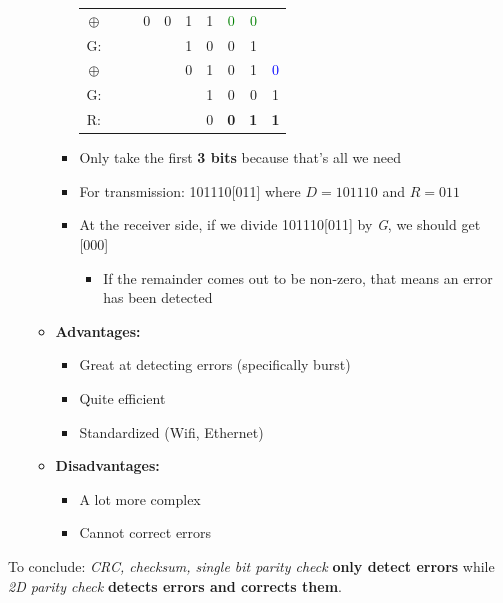 \documentclass{article}
\begin{document}
\begin{itemize}
\begin{itemize}
\begin{itemize}
\begin{center}
\begin{tabular}{cccccccccc}
                    \hline
                    $\oplus$ & & & 0 & 0 & 1 & 1 & \textcolor{green}0 & \textcolor{green}0 \\
                    G: & & & & & 1 & 0 & 0 & 1 \\
                    \hline
                    $\oplus$ & & & & & 0 & 1 & 0 & 1 & \textcolor{blue}0 \\
                    G: & & & & & & 1 & 0 & 0 & 1 \\
                    \hline
                    R: & & & & & & 0 & \textbf{0} & \textbf{1} & \textbf{1}
                \end{tabular}
            \end{center}
            \item Only take the first \textbf{3 bits} because that's all we need
            \item For transmission: 101110[011] where $D=101110$ and $R=011$
            \item At the receiver side, if we divide 101110[011] by \textit{G}, we should get 
            [000]
            \begin{itemize}
                \item If the remainder comes out to be non-zero, that means an error has been detected
            \end{itemize}
        \end{itemize}
        \item \textbf{Advantages:}
        \begin{itemize}
            \item Great at detecting errors (specifically burst)
            \item Quite efficient
            \item Standardized (Wifi, Ethernet)
        \end{itemize}
        \item \textbf{Disadvantages:}
        \begin{itemize}
            \item A lot more complex
            \item Cannot correct errors
        \end{itemize}
    \end{itemize}
\end{itemize}
To conclude: \textit{CRC, checksum, single bit parity check} \textbf{only detect errors} while \textit{2D parity
check} \textbf{detects errors and corrects them}.
\newpage
\end{document}
